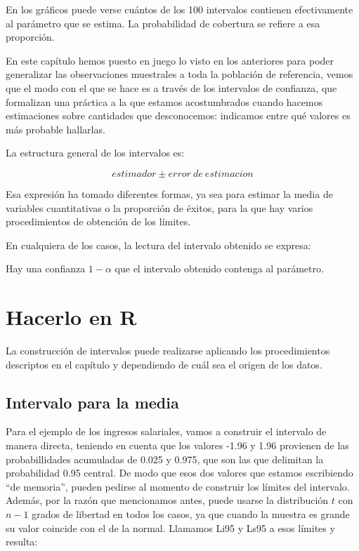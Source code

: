 \documentclass[]{book}
\begin{document}
En los gráficos puede verse cuántos de los 100 intervalos contienen efectivamente al parámetro que se estima. La probabilidad de cobertura se refiere a esa proporción.

En este capítulo hemos puesto en juego lo visto en los anteriores para
poder generalizar las observaciones muestrales a toda la población de
referencia, vemos que el modo con el que se hace es a través de los
intervalos de confianza, que formalizan una práctica a la que estamos
acostumbrados cuando hacemos estimaciones sobre cantidades que
desconocemos: indicamos entre qué valores es más probable hallarlas.

La estructura general de los intervalos es:

\[estimador \pm error\ de\ estimacion\]

Esa expresión ha tomado diferentes formas, ya sea para estimar la media
de variables cuantitativas o la proporción de éxitos, para la que hay
varios procedimientos de obtención de los límites.

En cualquiera de los casos, la lectura del intervalo obtenido se
expresa:

Hay una confianza \(1 - \alpha\) que el intervalo obtenido contenga al
parámetro.

\hypertarget{hacerlo-en-r-7}{%
\section{Hacerlo en R}\label{hacerlo-en-r-7}}

La construcción de intervalos puede realizarse aplicando los procedimientos descriptos en el capítulo y dependiendo de cuál sea el origen de los datos.

\hypertarget{intervalo-para-la-media}{%
\subsection{Intervalo para la media}\label{intervalo-para-la-media}}

Para el ejemplo de los ingresos salariales, vamos a construir el intervalo de manera directa, teniendo en cuenta que los valores -1.96 y 1.96 provienen de las probabillidades acumuladas de 0.025 y 0.975, que son las que delimitan la probabilidad 0.95 central. De modo que esos dos valores que estamos escribiendo ``de memoria'', pueden pedirse al momento de construir los límites del intervalo. Además, por la razón que mencionamos antes, puede usarse la distribución \(t\) con \(n-1\) grados de libertad en todos los casos, ya que cuando la muestra es grande su valor coincide con el de la normal. Llamamos Li95 y Ls95 a esos límites y resulta:
\end{document}
